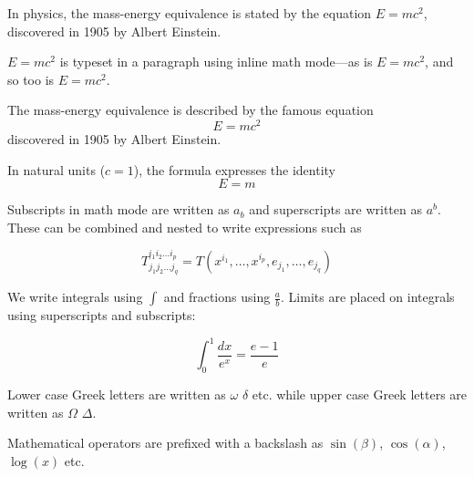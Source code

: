 \documentclass[12pt, letterpaper]{article}
\begin{document}
	In physics, the mass-energy equivalence is stated by the equation $E=mc^2$, discovered in 1905 by Albert Einstein.
	
	\begin{math}
		E=mc^2
	\end{math} is typeset in a paragraph using inline math mode---as is $E=mc^2$, and so too is \(E=mc^2\).
	
	The mass-energy equivalence is described by the famous equation
	\[ E=mc^2 \] discovered in 1905 by Albert Einstein. 
	
	In natural units ($c = 1$), the formula expresses the identity
	\begin{equation}
		E=m
	\end{equation}
	
	Subscripts in math mode are written as $a_b$ and superscripts are written as $a^b$. These can be combined and nested to write expressions such as
	
	\[ T^{i_1 i_2 \dots i_p}_{j_1 j_2 \dots j_q} = T(x^{i_1},\dots,x^{i_p},e_{j_1},\dots,e_{j_q}) \]
	
	We write integrals using $\int$ and fractions using $\frac{a}{b}$. Limits are placed on integrals using superscripts and subscripts:
	
	\[ \int_0^1 \frac{dx}{e^x} =  \frac{e-1}{e} \]
	
	Lower case Greek letters are written as $\omega$ $\delta$ etc. while upper case Greek letters are written as $\Omega$ $\Delta$.
	
	Mathematical operators are prefixed with a backslash as $\sin(\beta)$, $\cos(\alpha)$, $\log(x)$ etc.
\end{document}
